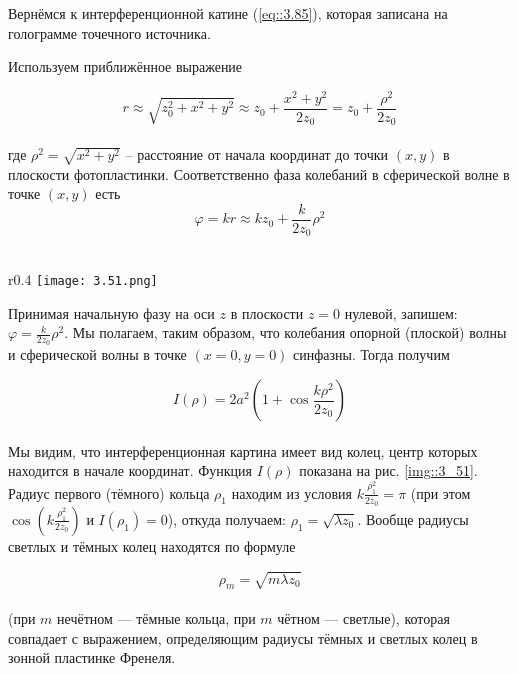 Вернёмся к интерференционной катине (\ref{eq::3.85}), которая записана на голограмме точечного
источника. 

Используем приближённое выражение

\begin{equation}
r \approx \sqrt{z_0^2 + x^2 + y^2} \approx z_0 + \frac{x^2 + y^2}{2 z_0} = z_0 + \frac{\rho^2}{2 z_0}
\end{equation}
\\
где $\rho^2 = \sqrt{x^2 + y^2}$ -- расстояние от начала координат до точки $(x, y)$ в плоскости
фотопластинки. Соответственно фаза колебаний в сферической волне в точке $(x, y)$ есть
\newpage
\begin{equation}\label{eq::3.86}
\varphi = k r \approx k z_0 + \frac{k}{2 z_0} \rho^2
\end{equation}
\\
\begin{wrapfigure}{r}{0.4\linewidth}
    \texttt{[image: 3.51.png]}
    \caption{Зависимость $I(\rho)$}
    \label{img::3_51}
\end{wrapfigure}

Принимая начальную фазу на оси $z$ в плоскости $z = 0$ нулевой, запишем:
$\varphi = \frac{k}{2 z_0} \rho^2$. Мы полагаем, таким образом, что колебания опорной (плоской)
волны и сферической волны в точке $(x = 0,y = 0)$ синфазны. Тогда получим

\begin{equation}
    I(\rho) = 2 a^2 \left( 1 + \cos \frac{k \rho^2}{2 z_0} \right)
\end{equation}
\\
Мы видим, что интерференционная картина имеет вид колец, центр которых находится в начале координат. 
Функция $I(\rho)$ показана на рис. \ref{img::3_51}. Радиус первого (тёмного) кольца $\rho_1$
находим из условия $k \frac{\rho_1^2}{2 z_0} = \pi$ (при этом 
$\cos \left( k \frac{\rho_1^2}{2 z_0} \right)$ и $I(\rho_1) = 0$), откуда получаем: 
$\rho_1 = \sqrt{\lambda z_0}$. Вообще радиусы светлых и тёмных колец находятся по формуле

\begin{equation}\label{eq::3.88}
    \rho_m  = \sqrt{m \lambda z_0}
\end{equation}
\\
(при $m$ нечётном — тёмные кольца, при $m$ чётном — светлые), которая совпадает с выражением, 
определяющим радиусы тёмных и светлых колец в зонной пластинке Френеля.

